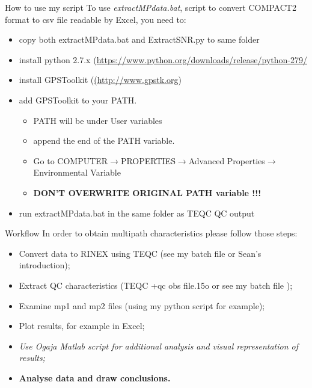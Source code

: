 \documentclass[11pt]{beamer}
\begin{document}
	\begin{frame}[allowframebreaks]{How to use my script}
		To use \textit{extractMPdata.bat}, script to convert COMPACT2 format to csv file readable by Excel, you need to:
		\begin{itemize}
			\item copy both extractMPdata.bat and ExtractSNR.py to same folder
			\item install python 2.7.x (\url{https://www.python.org/downloads/release/python-279/}
			\item install GPSToolkit (\url{(http://www.gpstk.org})
			\item add GPSToolkit to your PATH. 
				\begin{itemize}
					\item PATH will be under User variables
					\item append  the end of the PATH variable.
					\item Go to COMPUTER$\rightarrow$PROPERTIES$\rightarrow$Advanced Properties$\rightarrow$Environmental Variable
					\item \textbf{DON'T OVERWRITE ORIGINAL PATH variable !!!}
				\end{itemize}
			\item run extractMPdata.bat in the same folder as TEQC QC output
		\end{itemize}
		
	\end{frame}	
	
	\begin{frame}{Workflow}
		In order to obtain multipath characteristics please follow those steps:
		
		\begin{itemize}
			\item Convert data to RINEX using TEQC (see my batch file or Sean's introduction);
			\item {Extract QC characteristics  (TEQC +qc obs file.15o or see my batch file )};
			\item Examine mp1 and mp2 files (using my python script for example);
			\item Plot results, for example in Excel;
			\item \textit{Use Ogaja Matlab script for additional analysis and visual representation of results;}
			\item \textbf{Analyse data and draw conclusions.}
		\end{itemize}

	\end{frame}
\end{document}
